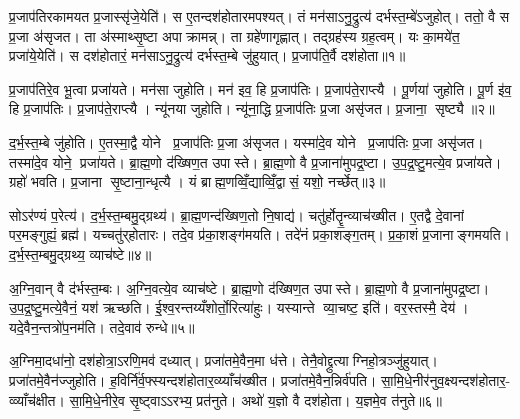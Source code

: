 

\clearpage
{}
\setcounter{anuvakam}{0}
प्र॒जाप॑तिरकामयत प्र॒जास्सृ॑जे॒येति॑। स ए॒तन्दश॑होतारमपश्यत्। तं मन॑साऽनु॒द्रुत्य॑ दर्भस्त॒म्बे॑ऽजुहोत्। ततो॒ वै स प्र॒जा अ॑सृजत। ता अ॑स्माथ्सृ॒ष्टा अपाक्रामन्न्। ता ग्रहे॑णागृह्णात्। तद्ग्रह॑स्य ग्रह॒त्वम्। यः का॒मये॑त॒ प्रजा॑ये॒येति॑। स दश॑होतारं॒ मन॑साऽनु॒द्रुत्य॑ दर्भस्त॒म्बे जु॑हुयात्। प्र॒जाप॑ति॒र्वै दश॑होता॥१॥

प्र॒जाप॑तिरे॒व भू॒त्वा प्रजा॑यते। मन॑सा जुहोति। मन॑ इव॒ हि प्र॒जाप॑तिः। प्र॒जाप॑ते॒राप्त्यै। पू॒र्णया॑ जुहोति। पू॒र्ण इ॑व॒ हि प्र॒जाप॑तिः। प्र॒जाप॑ते॒राप्त्यै। न्यू॑नया जुहोति। न्यू॑ना॒द्धि प्र॒जाप॑तिः प्र॒जा असृ॑जत। प्र॒जाना॒ सृष्ट्यै॥२॥

द॒र्भ॒स्त॒म्बे जु॑होति। ए॒तस्मा॒द्वै योने प्र॒जाप॑तिः प्र॒जा अ॑सृजत। यस्मा॑दे॒व योने प्र॒जाप॑तिः प्र॒जा असृ॑जत। तस्मा॑दे॒व योने॒ प्रजा॑यते। ब्रा॒ह्म॒णो द॑ख्षिण॒त उपास्ते। ब्रा॒ह्म॒णो वै प्र॒जाना॑मुपद्र॒ष्टा। उ॒प॒द्र॒ष्टु॒मत्ये॒व प्रजा॑यते। ग्रहो॑ भवति। प्र॒जाना सृ॒ष्टाना॒न्धृत्यै। यं ब्राह्म॒णव्विँ॒द्याव्विँ॒द्वासं॒ यशो॒ नर्च्छेत्॥३॥

सोऽर॑ण्यं प॒रेत्य॑। द॒र्भ॒स्त॒म्बमु॒द्ग्रथ्य॑। ब्रा॒ह्म॒णन्द॑ख्षिण॒तो नि॒षाद्य॑। चतु॑र्होतॄ॒न्व्याच॑ख्षीत। ए॒तद्वै दे॒वानां पर॒मङ्गुह्यं॒ ब्रह्म॑। यच्चतु॑र्‌होतारः। तदे॒व प्र॑का॒शङ्ग॑मयति। तदे॑नं प्रका॒शङ्ग॒तम्। प्र॒का॒शं प्र॒जानाङ्गमयति। द॒र्भ॒स्त॒म्बमु॒द्ग्रथ्य॒ व्याच॑ष्टे॥४॥

अ॒ग्नि॒वान् वै द॑र्भस्त॒म्बः। अ॒ग्नि॒वत्ये॒व व्याच॑ष्टे। ब्रा॒ह्म॒णो द॑ख्षिण॒त उपास्ते। ब्रा॒ह्म॒णो वै प्र॒जाना॑मुपद्र॒ष्टा। उ॒प॒द्र॒ष्टु॒मत्ये॒वैनं॒ यश॑ ऋच्छति। ई॒श्व॒रन्तय्यँशोर्तो॒रित्या॑हुः। यस्यान्ते व्या॒चष्ट॒ इति॑। वर॒स्तस्मै॒ देय॑। यदे॒वैन॒न्तत्रो॑प॒नम॑ति। तदे॒वाव॑ रुन्धे॥५॥

अ॒ग्निमा॒दधा॑नो॒ दश॑होत्रा॒ऽरणि॒मव॑ दध्यात्। प्रजा॑तमे॒वैन॒मा ध॑त्ते। तेनै॒वोद्द्रुत्याग्निहो॒त्रञ्जु॑हुयात्। प्रजा॑तमे॒वैन॑ज्जुहोति। ह॒विर्नि॑र्व॒फ्स्यन्दश॑होतार॒व्य्याँच॑ख्षीत। प्रजा॑तमे॒वैन॒न्निर्व॑पति। सा॒मि॒धे॒नीर॑नुव॒क्ष्यन्दश॑होतार॒- व्व्याँच॑क्षीत। सा॒मि॒धे॒नीरे॒व सृ॒ष्ट्वाऽऽरभ्य॒ प्रत॑नुते। अथो॑ य॒ज्ञो वै दश॑होता। य॒ज्ञमे॒व त॑नुते॥६॥

